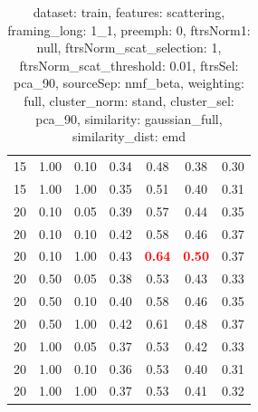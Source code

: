 \begin{table}
\begin{center}
\begin{tabular}{lllcccc}
15 & 1.00 & 0.10 & 0.34 & 0.48 & 0.38 & 0.30 \\ 
15 & 1.00 & 1.00 & 0.35 & 0.51 & 0.40 & 0.31 \\ 
20 & 0.10 & 0.05 & 0.39 & 0.57 & 0.44 & 0.35 \\ 
20 & 0.10 & 0.10 & 0.42 & 0.58 & 0.46 & 0.37 \\ 
20 & 0.10 & 1.00 & 0.43 & \textbf{\textcolor{red}{0.64}} & \textbf{\textcolor{red}{0.50}} & 0.37 \\ 
20 & 0.50 & 0.05 & 0.38 & 0.53 & 0.43 & 0.33 \\ 
20 & 0.50 & 0.10 & 0.40 & 0.58 & 0.46 & 0.35 \\ 
20 & 0.50 & 1.00 & 0.42 & 0.61 & 0.48 & 0.37 \\ 
20 & 1.00 & 0.05 & 0.37 & 0.53 & 0.42 & 0.33 \\ 
20 & 1.00 & 0.10 & 0.36 & 0.53 & 0.40 & 0.31 \\ 
20 & 1.00 & 1.00 & 0.37 & 0.53 & 0.41 & 0.32 \\ 
\end{tabular} 
\end{center} 
\caption{dataset: train, features: scattering, framing\_long: 1\_1, preemph: 0, ftrsNorm1: null, ftrsNorm\_scat\_selection: 1, ftrsNorm\_scat\_threshold: 0.01, ftrsSel: pca\_90, sourceSep: nmf\_beta, weighting: full, cluster\_norm: stand, cluster\_sel: pca\_90, similarity: gaussian\_full, similarity\_dist: emd} 
\label{datasetrFeaturscFraminlong1_1Preemp0Ftrsnorm1nuFtrsnoscatselect1Ftrsnoscatthresh0.01Ftrsselpc90SourcesepnmbeWeightfuClustenormstClusteselpc90SimilagafuSimiladistem} 
\end{table} 
 
